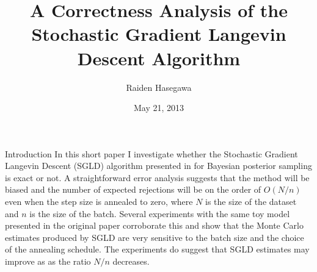 \documentclass{article}
\begin{document}
\title{A Correctness Analysis of the Stochastic Gradient Langevin Descent Algorithm}
\author{Raiden Hasegawa}
\date{May 21, 2013}

\maketitle

\thispagestyle{empty}

\begin{section}{Introduction}
In this short paper I investigate whether the Stochastic Gradient Langevin Descent (SGLD) algorithm presented in \cite{WelTeh2011a} for Bayesian posterior sampling is exact or not.  A straightforward error analysis suggests that the method will be biased and the number of expected rejections will be on the order of $O(N/n)$ even when the step size is annealed to zero, where $N$ is the size of the dataset and $n$ is the size of the batch.  Several experiments with the same toy model presented in the original paper corroborate this and show that the Monte Carlo estimates produced by SGLD are very sensitive to the batch size and the choice of the annealing schedule.  The experiments do suggest that SGLD estimates may improve as as the ratio $N/n$ decreases.
\end{section}
\end{document}

